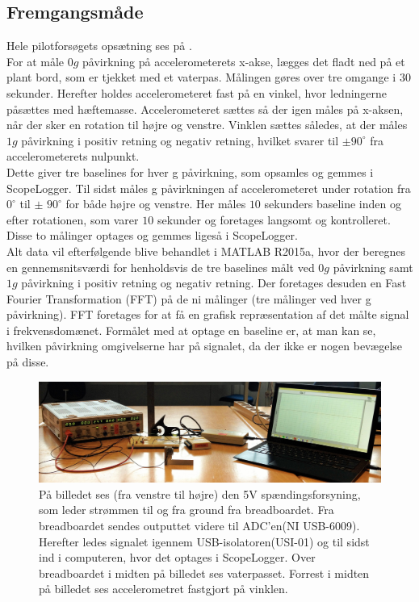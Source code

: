 \subsection{Fremgangsmåde}
Hele pilotforsøgets opsætning ses på . \\
For at måle $0g$ påvirkning på accelerometerets x-akse, lægges det fladt ned på et plant bord, som er tjekket med et vaterpas. Målingen gøres over tre omgange i $30$ sekunder. Herefter holdes accelerometeret fast på en vinkel, hvor ledningerne påsættes med hæftemasse. Accelerometeret sættes så der igen måles på x-aksen, når der sker en rotation til højre og venstre. Vinklen sættes således, at der måles $1g$ påvirkning i positiv retning og negativ retning, hvilket svarer til $\pm90^{\circ}$ fra accelerometerets nulpunkt. \\
Dette giver tre baselines for hver g påvirkning, som opsamles og gemmes i ScopeLogger. %
Til sidst måles g påvirkningen af accelerometeret under rotation fra $0^{\circ}$ til $\pm$ $90^{\circ}$ for både højre og venstre. Her måles $10$ sekunders baseline inden og efter rotationen, som varer $10$ sekunder og foretages langsomt og kontrolleret. Disse to målinger optages og gemmes ligeså i ScopeLogger. \\
Alt data vil efterfølgende blive behandlet i MATLAB R2015a, hvor der beregnes en gennemsnitsværdi for henholdsvis de tre baselines målt ved $0g$ påvirkning samt $1g$ påvirkning i positiv retning og negativ retning. Der foretages desuden en Fast Fourier Transformation (FFT) på de ni målinger (tre målinger ved hver g påvirkning). FFT foretages for at få en grafisk repræsentation af det målte signal i frekvensdomænet. Formålet med at optage en baseline er, at man kan se, hvilken påvirkning omgivelserne har på signalet, da der ikke er nogen bevægelse på disse.

\begin{figure}[H]
	\centering
	\includegraphics[scale=0.14]{figures/cProblemloesning/Pilotforsoeg1_2.jpg}
	\caption{På billedet ses (fra venstre til højre) den 5V spændingsforsyning, som leder strømmen til og fra ground fra breadboardet. Fra breadboardet sendes outputtet videre til ADC'en(NI USB-6009). Herefter ledes signalet igennem USB-isolatoren(USI-01) og til sidst ind i computeren, hvor det optages i ScopeLogger. Over breadboardet i midten på billedet ses vaterpasset. Forrest i midten på billedet ses accelerometret fastgjort på vinklen.}
	\label{pforsoeg2}
\end{figure}

